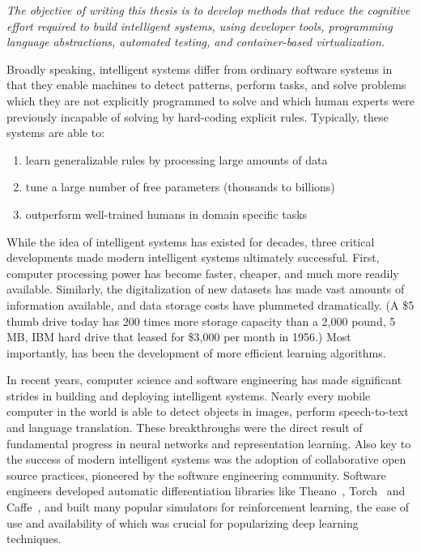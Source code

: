 \documentclass[12pt,initial,twoside,maitrise]{dms}
\numberwithin{equation}{section}
\numberwithin{table}{chapter}
\numberwithin{figure}{chapter}
\begin{document}
\textit{The objective of writing this thesis is to develop methods that reduce the cognitive effort required to build intelligent systems, using developer tools, programming language abstractions, automated testing, and container-based virtualization.}

Broadly speaking, intelligent systems differ from ordinary software systems in that they enable machines to detect patterns, perform tasks, and solve problems which they are not explicitly programmed to solve and which human experts were previously incapable of solving by hard-coding explicit rules. Typically, these systems are able to:\\
%
\begin{enumerate}
    \item learn generalizable rules by processing large amounts of data
    \item tune a large number of free parameters (thousands to billions)
    \item outperform well-trained humans in domain specific tasks
\end{enumerate}
%
While the idea of intelligent systems has existed for decades, three critical developments made modern intelligent systems ultimately successful. First, computer processing power has become faster, cheaper, and much more readily available. Similarly, the digitalization of new datasets has made vast amounts of information available, and data storage costs have plummeted dramatically. (A \$5 thumb drive today has 200 times more storage capacity than a 2,000 pound, 5 MB, IBM hard drive that leased for \$3,000 per month in 1956.) Most importantly, has been the development of more efficient learning algorithms.

In recent years, computer science and software engineering has made significant strides in building and deploying intelligent systems. Nearly every mobile computer in the world is able to detect objects in images, perform speech-to-text and language translation. These breakthroughs were the direct result of fundamental progress in neural networks and representation learning. Also key to the success of modern intelligent systems was the adoption of collaborative open source practices, pioneered by the software engineering community. Software engineers developed automatic differentiation libraries like Theano~\cite{theano}, Torch~\cite{collobert2002torch} and Caffe~\cite{jia2014caffe}, and built many popular simulators for reinforcement learning, the ease of use and availability of which was crucial for popularizing deep learning techniques.
\end{document}
